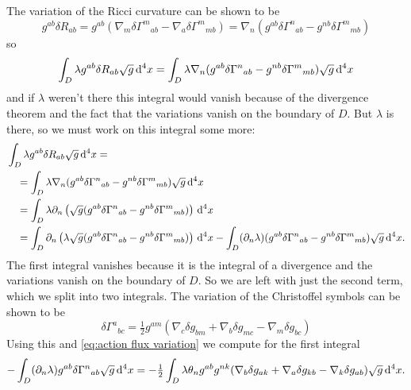 \documentclass[../main.tex]{subfiles}
\begin{document}
The variation of the Ricci curvature can be shown to be
\begin{equation}\label{eq:variation ricci curvature}
	g^{ab} \delta R_{ab} = g^{ab}(\nabla_m \delta{\Gamma^m}_{ab} - \nabla_a \delta
	{\Gamma^m}_{mb}) = \nabla_n(g^{ab} {\delta\Gamma^n}_{ab} - g^{nb} \delta
	{\Gamma^m}_{mb})
\end{equation}
so
\begin{equation*}
	\int_D \lambda g^{ab}\delta R_{ab} \sqrt{g} \,\mathrm{d}^4 x = \int_D \lambda \nabla_n(g^{ab}
	{\delta\Gamma^n}_{ab} - g^{nb} \delta {\Gamma^m}_{mb}) \sqrt{g} \,\mathrm{d}^4x
\end{equation*}
and if \( \lambda \) weren't there this integral would vanish because of the divergence
theorem and the fact that the variations vanish on the boundary of \( D \). But \( \lambda
\) is there, so we must work on this integral some more:
\begin{align*}
	& \int_D \lambda g^{ab}\delta R_{ab} \sqrt{g} \,\mathrm{d}^4 x = \\
	& \quad = \int_D \lambda \nabla_n(g^{ab} {\delta\Gamma^n}_{ab} - g^{nb} \delta
	{\Gamma^m}_{mb}) \sqrt{g} \,\mathrm{d}^4x \\
	& \quad = \int_D \lambda \partial_n \left( \sqrt{g}(g^{ab} {\delta\Gamma^n}_{ab} - g^{nb} \delta
	{\Gamma^m}_{mb})\right) \,\mathrm{d}^4 x \\
	& \quad = \int_D \partial_n \left( \lambda\sqrt{g}(g^{ab} {\delta\Gamma^n}_{ab} - g^{nb}
	\delta {\Gamma^m}_{mb})\right) \,\mathrm{d}^4 x - \int_D (\partial_n \lambda) (g^{ab}
	{\delta\Gamma^n}_{ab} - g^{nb} \delta {\Gamma^m}_{mb}) \sqrt{g} \,\mathrm{d}^4 x. 
\end{align*}
The first integral vanishes because it is the integral of a divergence and the variations
vanish on the boundary of \( D \). So we are left with just the second term, which we
split into two integrals. The variation of the Christoffel symbols can be shown to be
\begin{equation} \label{eq:variation christoffel symbols}
	\delta {\Gamma^a}_{bc} = \tfrac{1}{2} g^{am}(\nabla_c \delta g_{bm} + \nabla_b \delta
	g_{mc} - \nabla_m \delta g_{bc})
\end{equation}
Using this and \cref{eq:action flux variation} we compute for the first integral
\begin{equation}\label{eq:first three terms}
	-\int_D (\partial_n \lambda) g^{ab} \delta{\Gamma^n}_{ab} \sqrt{g} \,\mathrm{d}^4 x = -
	\tfrac{1}{2} \int_D \lambda\theta_n g^{ab} g^{nk}(\nabla_b \delta g_{ak} + \nabla_a
	\delta g_{kb} - \nabla_k \delta g_{ab}) \sqrt{g} \,\mathrm{d}^4 x. 
\end{equation}
\end{document}
